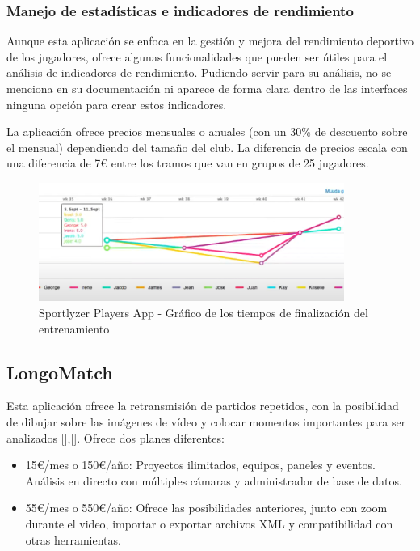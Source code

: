 \subsubsection{Manejo de estadísticas e indicadores de rendimiento}
Aunque esta aplicación se enfoca en la gestión y mejora del rendimiento deportivo de los jugadores, ofrece algunas funcionalidades que pueden ser útiles para el análisis de indicadores de rendimiento. Pudiendo servir para su análisis, no se menciona en su documentación ni aparece de forma clara dentro de las interfaces ninguna opción para crear estos indicadores.

La aplicación ofrece precios mensuales o anuales (con un 30\% de descuento sobre el mensual) dependiendo del tamaño del club. La diferencia de precios escala con una diferencia de 7€ entre los tramos que van en grupos de 25 jugadores.

\begin{figure}[h]
    \centering
    \includegraphics[width=10cm]{archivos/tfg_jorge/sportlyzer_graph_sesion_entrenamiento}
    \caption{Sportlyzer Players App - Gráfico de los tiempos de finalización del entrenamiento}\label{sistemass2}
\end{figure}


\subsection{LongoMatch}
Esta aplicación ofrece la retransmisión de partidos repetidos, con la posibilidad de dibujar sobre las imágenes de vídeo y colocar momentos importantes para ser analizados [\cite{LongoMatchApp}],[\cite{LongoMatchVideo}].
Ofrece dos planes diferentes:

\begin{itemize}
    \item 15€/mes o 150€/año: Proyectos ilimitados, equipos, paneles y eventos. Análisis en directo con múltiples cámaras y  administrador de base de datos.
    \item 55€/mes o 550€/año: Ofrece las posibilidades anteriores, junto con zoom durante el video, importar o exportar archivos XML y compatibilidad con otras herramientas.
\end{itemize}

